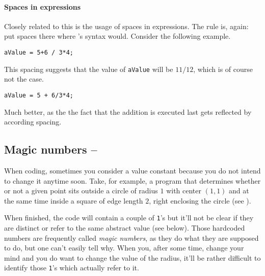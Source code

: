 \paragraph{Spaces in expressions} Closely related to this is the usage of spaces in expressions. The rule is, again: put spaces there where \matlab{}'s syntax would. Consider the following example.

\hfill
\begin{minipage}[t]{.45\textwidth}
\begin{lstlisting}[framerule=2pt,rulecolor=\color{badred}]
aValue = 5+6 / 3*4;
\end{lstlisting}
This spacing suggests that the value of \lstinline!aValue! will be $11/12$, which is of course not the case.
\end{minipage}
\hfill
\begin{minipage}[t]{.45\textwidth}
\begin{lstlisting}[framerule=2pt,rulecolor=\color{goodgreen}]
aValue = 5 + 6/3*4;
\end{lstlisting}
Much better, as the the fact that the addition is executed last gets reflected by according spacing.
\end{minipage}
\hfill



\subsection{Magic numbers -- \cleansymbol\cleansymbol\cleansymbol}

When coding, sometimes you consider a value constant because you do not intend to change it anytime soon. Take, for example, a program that determines whether or not a given point sits outside a circle of radius $1$ with center $(1,1)$ and at the same time inside a square of edge length $2$, right enclosing the circle (see \cite{Hull:2006:CCM}).

When finished, the code will contain a couple of \lstinline!1!'s but it'll not be clear if they are distinct or refer to the same abstract value (see below). Those hardcoded numbers are frequently called \emph{magic numbers}, as they do what they are supposed to do, but one can't easily tell why. When you, after some time, change your mind and you do want to change the value of the radius, it'll be rather difficult to identify those \lstinline!1!'s which actually refer to it.


